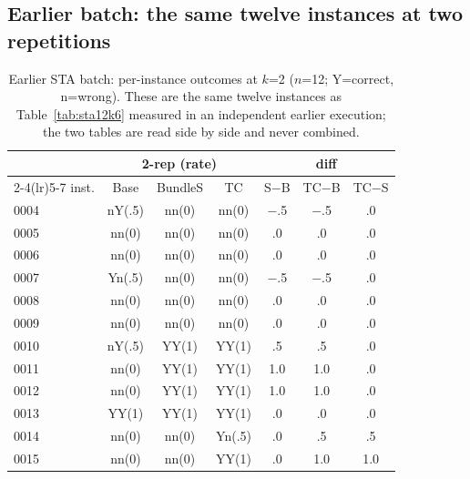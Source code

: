 \documentclass{article}
\begin{document}
\subsection*{Earlier batch: the same twelve instances at two repetitions}
\begin{table}[h]
\centering\footnotesize
\caption{Earlier STA batch: per-instance outcomes at $k$=2 ($n$=12; Y=correct, n=wrong). These are the same twelve instances as Table~\ref{tab:sta12k6} measured in an independent earlier execution; the two tables are read side by side and never combined.}
\label{tab:sta12}
\begin{tabular}{l ccc ccc}
\toprule & \multicolumn{3}{c}{2-rep (rate)} & \multicolumn{3}{c}{diff} \\
\cmidrule(lr){2-4}\cmidrule(lr){5-7} inst. & Base & BundleS & TC & S$-$B & TC$-$B & TC$-$S \\ \midrule
0004 & nY(.5) & nn(0) & nn(0) & $-$.5 & $-$.5 & .0 \\
0005 & nn(0) & nn(0) & nn(0) & .0 & .0 & .0 \\
0006 & nn(0) & nn(0) & nn(0) & .0 & .0 & .0 \\
0007 & Yn(.5) & nn(0) & nn(0) & $-$.5 & $-$.5 & .0 \\
0008 & nn(0) & nn(0) & nn(0) & .0 & .0 & .0 \\
0009 & nn(0) & nn(0) & nn(0) & .0 & .0 & .0 \\
0010 & nY(.5) & YY(1) & YY(1) & .5 & .5 & .0 \\
0011 & nn(0) & YY(1) & YY(1) & 1.0 & 1.0 & .0 \\
0012 & nn(0) & YY(1) & YY(1) & 1.0 & 1.0 & .0 \\
0013 & YY(1) & YY(1) & YY(1) & .0 & .0 & .0 \\
0014 & nn(0) & nn(0) & Yn(.5) & .0 & .5 & .5 \\
0015 & nn(0) & nn(0) & YY(1) & .0 & 1.0 & 1.0 \\
\bottomrule
\end{tabular}
\end{table}
\end{document}
